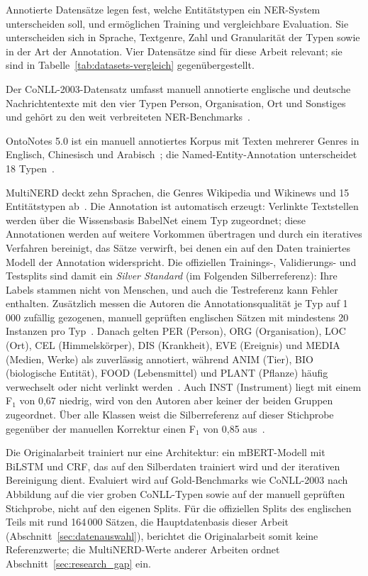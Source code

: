 Annotierte Datensätze legen fest, welche Entitätstypen ein NER-System
unterscheiden soll, und ermöglichen Training und vergleichbare
Evaluation.
Sie unterscheiden sich in Sprache, Textgenre, Zahl und Granularität der
Typen sowie in der Art der Annotation.
Vier Datensätze sind für diese Arbeit relevant; sie sind in
Tabelle~\ref{tab:datasets-vergleich} gegenübergestellt.

Der CoNLL-2003-Datensatz umfasst manuell annotierte englische und
deutsche Nachrichtentexte mit den vier Typen Person, Organisation, Ort
und Sonstiges~\cite{sang2003conll} und gehört zu den weit verbreiteten
NER-Benchmarks~\cite{li2018survey}.

OntoNotes 5.0 ist ein manuell annotiertes Korpus mit Texten mehrerer
Genres in Englisch, Chinesisch und
Arabisch~\cite{weischedel2013ontonotes}; die Named-Entity-Annotation
unterscheidet 18 Typen~\cite{li2018survey}.

MultiNERD deckt zehn Sprachen, die Genres Wikipedia und Wikinews und
15 Entitätstypen ab~\cite{tedeschi2022multinerd}.
Die Annotation ist automatisch erzeugt: Verlinkte Textstellen werden über
die Wissensbasis BabelNet einem Typ zugeordnet; diese Annotationen
werden auf weitere Vorkommen übertragen und durch ein iteratives Verfahren bereinigt, das Sätze
verwirft, bei denen ein auf den Daten trainiertes Modell der Annotation
widerspricht.
Die offiziellen Trainings-, Validierungs- und Testsplits sind damit ein
\emph{Silver Standard} (im Folgenden Silberreferenz): Ihre Labels stammen nicht von Menschen, und auch
die Testreferenz kann Fehler enthalten.
Zusätzlich messen die Autoren die Annotationsqualität je Typ auf
1\,000 zufällig gezogenen, manuell geprüften englischen Sätzen mit
mindestens 20 Instanzen pro Typ~\cite[Abschn.~5.3, Tab.~5]{tedeschi2022multinerd}.
Danach gelten PER (Person), ORG (Organisation), LOC (Ort), CEL
(Himmelskörper), DIS (Krankheit), EVE (Ereignis) und MEDIA (Medien,
Werke) als zuverlässig annotiert, während ANIM (Tier), BIO (biologische
Entität), FOOD (Lebensmittel) und PLANT (Pflanze) häufig verwechselt
oder nicht verlinkt werden~\cite{tedeschi2022multinerd}.
Auch INST (Instrument) liegt mit einem F$_1$ von 0{,}67 niedrig, wird von
den Autoren aber keiner der beiden Gruppen zugeordnet.
Über alle Klassen weist die Silberreferenz auf dieser Stichprobe
gegenüber der manuellen Korrektur einen F$_1$ von 0{,}85
aus~\cite[Tab.~5]{tedeschi2022multinerd}.

Die Originalarbeit trainiert nur eine Architektur: ein mBERT-Modell mit
BiLSTM und CRF, das auf den Silberdaten trainiert wird und der
iterativen Bereinigung dient.
Evaluiert wird auf Gold-Benchmarks wie CoNLL-2003 nach Abbildung auf die
vier groben CoNLL-Typen sowie auf der manuell geprüften Stichprobe,
nicht auf den eigenen Splits.
Für die offiziellen Splits des englischen Teils mit rund 164\,000
Sätzen, die Hauptdatenbasis dieser Arbeit
(Abschnitt~\ref{sec:datenauswahl}), berichtet die Originalarbeit somit
keine Referenzwerte; die MultiNERD-Werte anderer Arbeiten ordnet
Abschnitt~\ref{sec:research_gap} ein.

